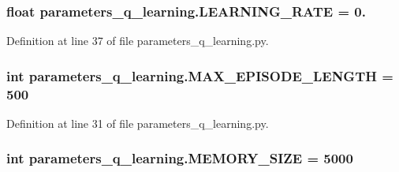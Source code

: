 \subsubsection[{\texorpdfstring{L\+E\+A\+R\+N\+I\+N\+G\+\_\+\+R\+A\+TE}{LEARNING_RATE}}]{\setlength{\rightskip}{0pt plus 5cm}float parameters\+\_\+q\+\_\+learning.\+L\+E\+A\+R\+N\+I\+N\+G\+\_\+\+R\+A\+TE = 0.}\hypertarget{namespaceparameters__q__learning_a88aea3d4050f21826e2d2c5f977df6df}{}\label{namespaceparameters__q__learning_a88aea3d4050f21826e2d2c5f977df6df}


Definition at line 37 of file parameters\+\_\+q\+\_\+learning.\+py.

\subsubsection[{\texorpdfstring{M\+A\+X\+\_\+\+E\+P\+I\+S\+O\+D\+E\+\_\+\+L\+E\+N\+G\+TH}{MAX_EPISODE_LENGTH}}]{\setlength{\rightskip}{0pt plus 5cm}int parameters\+\_\+q\+\_\+learning.\+M\+A\+X\+\_\+\+E\+P\+I\+S\+O\+D\+E\+\_\+\+L\+E\+N\+G\+TH = 500}\hypertarget{namespaceparameters__q__learning_a03ff8ce2ce05d074f13d67465b1aec22}{}\label{namespaceparameters__q__learning_a03ff8ce2ce05d074f13d67465b1aec22}


Definition at line 31 of file parameters\+\_\+q\+\_\+learning.\+py.

\subsubsection[{\texorpdfstring{M\+E\+M\+O\+R\+Y\+\_\+\+S\+I\+ZE}{MEMORY_SIZE}}]{\setlength{\rightskip}{0pt plus 5cm}int parameters\+\_\+q\+\_\+learning.\+M\+E\+M\+O\+R\+Y\+\_\+\+S\+I\+ZE = 5000}\hypertarget{namespaceparameters__q__learning_a10c41374c2df3aba0e4ae7ca509fc58c}{}\label{namespaceparameters__q__learning_a10c41374c2df3aba0e4ae7ca509fc58c}


